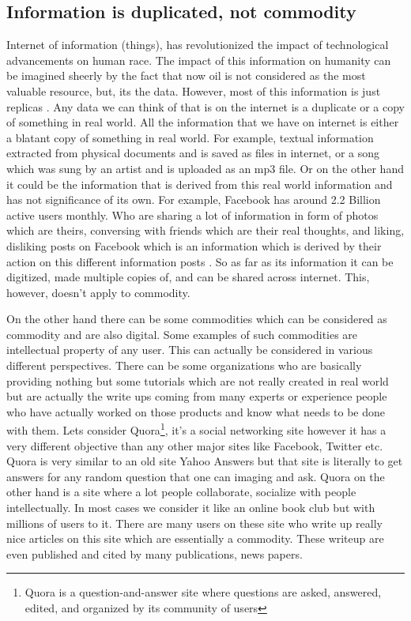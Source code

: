 \subsection{Information is duplicated, not commodity}

Internet of information (things), has revolutionized the impact of technological advancements on human race. The impact of this information on humanity can be imagined sheerly by the fact that now oil is not considered as the most valuable resource, but, its the data. However, most of this information is just replicas \cite{economist5}. Any data we can think of that is on the internet is a duplicate or a copy of something in real world. All the information that we have on internet is either a blatant copy of something in real world. For example, textual information extracted from physical documents and is saved as files in internet, or a song which was sung by an artist and is uploaded as an mp3 file. Or on the other hand it could be the information that is derived from this real world information and has not significance of its own. For example, Facebook has around 2.2 Billion active users monthly. Who are sharing a lot of information in form of photos which are theirs, conversing with friends which are their real thoughts, and liking, disliking posts on Facebook which is an information which is derived by their action on this different information posts \cite{statista6}. So as far as its information it can be digitized, made multiple copies of, and can be shared across internet. This, however, doesn't apply to commodity.


On the other hand there can be some commodities which can be considered as commodity and are also digital. Some examples of such commodities are intellectual property of any user. This can actually be considered in various different perspectives. There can be some organizations who are basically providing nothing but some tutorials which are not really created in real world but are actually the write ups coming from many experts or experience people who have actually worked on those products and know what needs to be done with them. Lets consider Quora\footnote{Quora is a question-and-answer site where questions are asked, answered, edited, and organized by its community of users}, it's a social networking site however it has a very different objective than any other major sites like Facebook, Twitter etc. Quora is very similar to an old site Yahoo Answers but that site is literally to get answers for any random question that one can imaging and ask. Quora on the other hand is a site where a lot people collaborate, socialize with people intellectually. In most cases we consider it like an online book club but with millions of users to it. There are many users on these site who write up really nice articles on this site which are essentially a commodity. These writeup are even published and cited by many publications, news papers.

